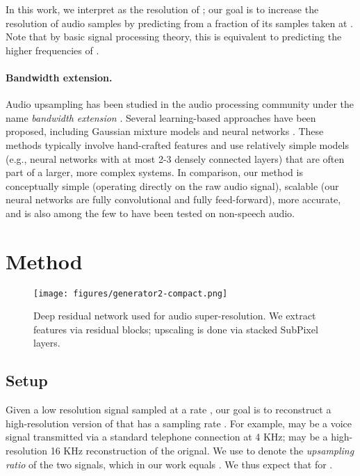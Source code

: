 \documentclass{article} \usepackage{iclr2017_workshop,times}
\begin{document}
In this work, we interpret  as the resolution of ; our goal is to increase the resolution of audio samples by predicting  from a fraction of its samples taken at . Note that by basic signal processing theory, this is equivalent to predicting the higher frequencies of .

\paragraph{Bandwidth extension.}

Audio upsampling has been studied in the audio processing community under the name {\em bandwidth extension} \citep{ekstrand2002bandwidth,larsen2005audio}. Several learning-based approaches have been proposed, including Gaussian mixture models \citep{cheng1994statistical, park2000narrowband} and neural networks \citep{li2015dnn}. These methods typically involve hand-crafted features and use relatively simple models (e.g., neural networks with at most 2-3 densely connected layers) that are often part of a larger, more complex systems. 
In comparison, our method is conceptually simple (operating directly on the raw audio signal), scalable (our neural networks are fully convolutional and fully feed-forward), more accurate, and is also among the few to have been tested on non-speech audio.





\section{Method}

\begin{figure}[t]
\vspace{-7mm}
\begin{center}
\texttt{[image: figures/generator2-compact.png]}
\end{center}
\caption{Deep residual network used for audio super-resolution. We extract features via  residual blocks; upscaling is done via stacked SubPixel layers.}
\end{figure}

\subsection{Setup}

Given a low resolution signal  sampled at a rate , our goal is to reconstruct a high-resolution version  of  that has a sampling rate . For example,  may be a voice signal transmitted via a standard telephone connection at 4 KHz;  may be a high-resolution 16 KHz reconstruction of the orignal.
We use  to denote the {\em upsampling ratio} of the two signals, which in our work equals . We thus expect that  for .
\end{document}

